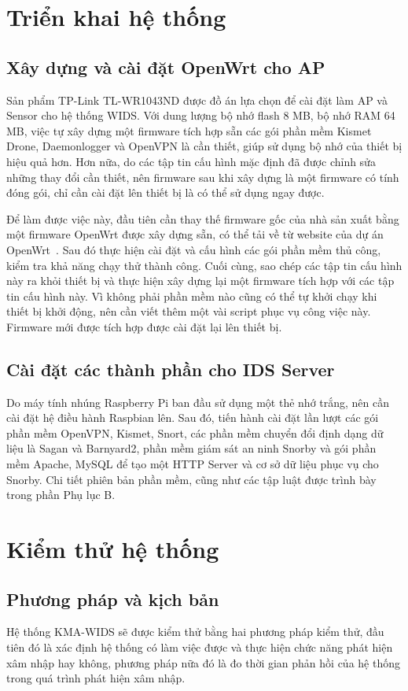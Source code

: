 \section{Triển khai hệ thống}
\subsection{Xây dựng và cài đặt OpenWrt cho AP}
Sản phẩm TP-Link TL-WR1043ND được đồ án lựa chọn để cài đặt làm AP và Sensor cho hệ thống WIDS. Với dung lượng bộ nhớ flash 8 MB, bộ nhớ RAM 64 MB, việc tự xây dựng một firmware tích hợp sẵn các gói phần mềm Kismet Drone, Daemonlogger và OpenVPN là cần thiết, giúp sử dụng bộ nhớ của thiết bị hiệu quả hơn. Hơn nữa, do các tập tin cấu hình mặc định đã được chỉnh sửa những thay đổi cần thiết, nên firmware sau khi xây dựng là một firmware có tính đóng gói, chỉ cần cài đặt lên thiết bị là có thể sử dụng ngay được.

Để làm được việc này, đầu tiên cần thay thế firmware gốc của nhà sản xuất bằng một firmware OpenWrt được xây dựng sẵn, có thể tải về từ website của dự án OpenWrt~\cite{openwrt2017wiki}. Sau đó thực hiện cài đặt và cấu hình các gói phần mềm thủ công, kiểm tra khả năng chạy thử thành công. Cuối cùng, sao chép các tập tin cấu hình này ra khỏi thiết bị và thực hiện xây dựng lại một firmware tích hợp với các tập tin cấu hình này. Vì không phải phần mềm nào cũng có thể tự khởi chạy khi thiết bị khởi động, nên cần viết thêm một vài script phục vụ công việc này. Firmware mới được tích hợp được cài đặt lại lên thiết bị.

\subsection{Cài đặt các thành phần cho IDS Server}
Do máy tính nhúng Raspberry Pi ban đầu sử dụng một thẻ nhớ trắng, nên cần cài đặt hệ điều hành Raspbian lên. Sau đó, tiến hành cài đặt lần lượt các gói phần mềm OpenVPN, Kismet, Snort, các phần mềm chuyển đổi định dạng dữ liệu là Sagan và Barnyard2, phần mềm giám sát an ninh Snorby và gói phần mềm Apache, MySQL để tạo một HTTP Server và cơ sở dữ liệu phục vụ cho Snorby. Chi tiết phiên bản phần mềm, cũng như các tập luật được trình bày trong phần Phụ lục B.

\section{Kiểm thử hệ thống}
\subsection{Phương pháp và kịch bản}
Hệ thống KMA-WIDS sẽ được kiểm thử bằng hai phương pháp kiểm thử, đầu tiên đó là xác định hệ thống có làm việc được và thực hiện chức năng phát hiện xâm nhập hay không, phương pháp nữa đó là đo thời gian phản hồi của hệ thống trong quá trình phát hiện xâm nhập.

